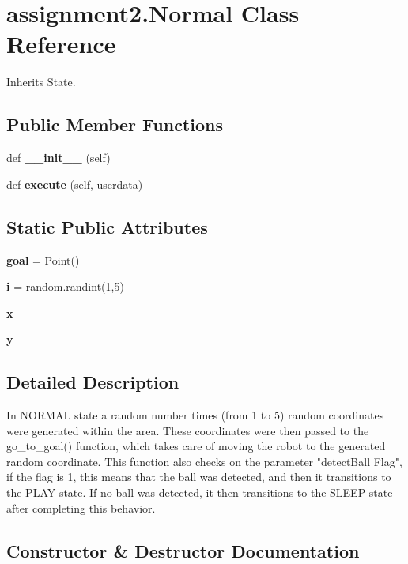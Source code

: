 \section{assignment2.\+Normal Class Reference}
\label{classassignment2_1_1_normal}


Inherits State.

\subsection*{Public Member Functions}
\begin{DoxyCompactItemize}
\item 
def \textbf{ \+\_\+\+\_\+init\+\_\+\+\_\+} (self)
\item 
def \textbf{ execute} (self, userdata)
\end{DoxyCompactItemize}
\subsection*{Static Public Attributes}
\begin{DoxyCompactItemize}
\item 
\textbf{ goal} = Point()
\item 
\textbf{ i} = random.\+randint(1,5)
\item 
\textbf{ x}
\item 
\textbf{ y}
\end{DoxyCompactItemize}


\subsection{Detailed Description}
\begin{DoxyVerb}In NORMAL state a random number times (from 1 to 5) random coordinates were generated within the area.
These coordinates were then passed to the go_to_goal() function, which takes care of moving the robot to the generated random coordinate. 
This function also checks on the parameter "detectBall Flag", if the flag is 1, this means that the ball was detected, and then it transitions to the PLAY state.
If no ball was detected, it then transitions to the SLEEP state after completing this behavior.
\end{DoxyVerb}
 

\subsection{Constructor \& Destructor Documentation}
\mbox{\label{classassignment2_1_1_normal_a0de5fe49746b8b912c3fb808bfa2474a}} 
